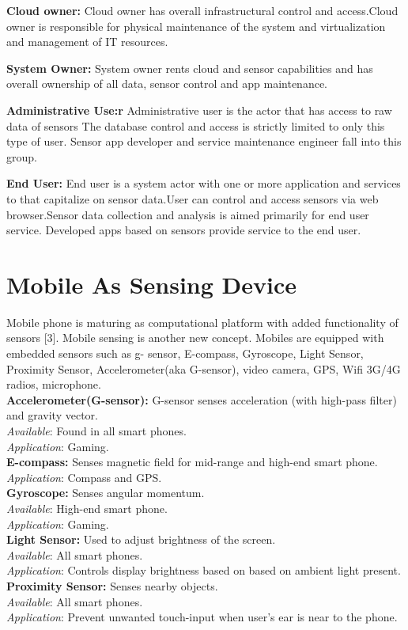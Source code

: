 \documentclass {report}
\begin{document}
{\bfseries Cloud owner:}
Cloud owner has overall infrastructural control and access.Cloud owner is responsible for physical maintenance of the system and virtualization and management of IT resources.

{\bfseries System Owner:}
System owner rents cloud and sensor capabilities and has overall ownership of all data, sensor control and app maintenance.

{\bfseries Administrative Use:r}
Administrative user is the actor that has access to raw data of sensors The database control and access is strictly limited to only this type of user. Sensor app developer and service maintenance engineer fall into this group.

{\bfseries End User:}
 End user is a system actor with one or more application and services to that capitalize on sensor data.User can control and access sensors via web browser.Sensor data collection and analysis is aimed primarily for end user service. Developed apps based on sensors provide service to the end user.


\section{Mobile As Sensing Device}
Mobile phone is maturing as computational platform with added functionality of sensors [3]. Mobile sensing is another new concept.
Mobiles are equipped with embedded sensors such as g- sensor, E-compass, Gyroscope, Light Sensor, Proximity Sensor, Accelerometer(aka G-sensor), video camera, GPS, Wifi 3G/4G radios, microphone.\\
{\bfseries {\small Accelerometer(G-sensor):}}
G-sensor senses acceleration (with high-pass filter) and gravity vector.\\
\emph{Available}: Found in all smart phones.\\
\emph{Application}: Gaming.\\
{\bfseries {\small E-compass:}}
Senses magnetic field for mid-range and high-end smart phone.\\
\emph{Application}: Compass and GPS.\\
{\bfseries {\small Gyroscope:}} Senses angular momentum.\\
\emph{Available}: High-end smart phone.\\
\emph{Application}: Gaming.\\
{\bfseries {\small Light Sensor:}} 
Used to adjust brightness of the screen.\\
\emph{Available}: All smart phones.\\
\emph{Application}: Controls display brightness based on based on ambient light present.\\
{\bfseries {\small Proximity Sensor:}} Senses nearby objects.\\
\emph{Available}: All smart phones.\\
\emph{Application}: Prevent unwanted touch-input when user's ear is near to the phone.\\
\end{document}
